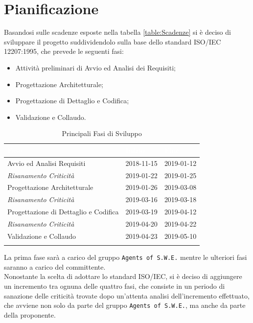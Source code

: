 \section{Pianificazione}
\label{Pianificazione}
Basandosi sulle scadenze esposte nella tabella \ref{table:Scadenze} si è deciso di sviluppare il progetto suddividendolo sulla base dello standard ISO/IEC 12207:1995, che prevede le seguenti fasi:
\begin{itemize}
	\item Attività preliminari di Avvio ed Analisi dei Requisiti;
	\item Progettazione Architetturale;
	\item Progettazione di Dettaglio e Codifica;
	\item Validazione e Collaudo.
\end{itemize}

\begin{longtable}{|C{.46\textwidth}|C{.20\textwidth}|C{.20\textwidth}|}
\hline
{}\textbf{\textcolor{white}{Fase}} & \textbf{\textcolor{white}{Inizio}} & \textbf{\textcolor{white}{Fine}}
\\
\hline \hline
\endfirsthead
\hline
Avvio ed Analisi Requisiti & 2018-11-15 & 2019-01-12 \\
\hline
{}\textit{Risanamento Criticità} & 2019-01-22 & 2019-01-25 \\
\hline
Progettazione Architetturale & 2019-01-26 & 2019-03-08 \\
\hline
{}\textit{Risanamento Criticità} & 2019-03-16 & 2019-03-18 \\
\hline
Progettazione di Dettaglio e Codifica & 2019-03-19 & 2019-04-12 \\
\hline
{}\textit{Risanamento Criticità} & 2019-04-20 & 2019-04-22 \\
\hline
Validazione e Collaudo & 2019-04-23 & 2019-05-10 \\
\hline
\caption{Principali Fasi di Sviluppo \label{Tabella Fasi di Sviluppo}}
\end{longtable}

La prima fase sarà a carico del gruppo \texttt{Agents of S.W.E.} mentre le ulteriori fasi saranno a carico del committente. \\
Nonostante la scelta di adottare lo standard ISO/IEC, si è deciso di aggiungere un incremento tra ognuna delle quattro fasi, che consiste in un periodo di sanazione delle criticità trovate dopo un'attenta analisi dell'incremento effettuato, che avviene non solo da parte del gruppo \texttt{Agents of S.W.E.}, ma anche da parte della proponente. 

